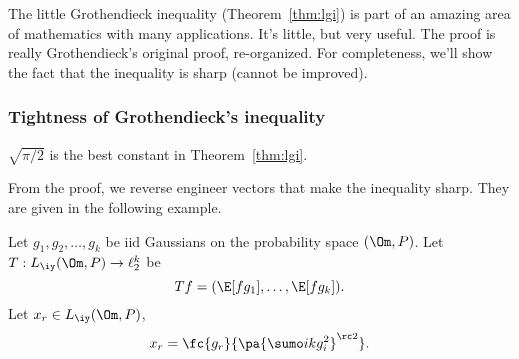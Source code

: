 

The little Grothendieck inequality (Theorem~\ref{thm:lgi}) is part of an amazing area of mathematics with many applications. It's little, but very useful. %
The proof is really Grothendieck's original proof, re-organized. For completeness, we'll show the fact that the inequality is sharp (cannot be improved). 

\subsubsection{Tightness of Grothendieck's inequality}

\begin{cor} $\sqrt{\pi/2}$ is the best constant in Theorem~\ref{thm:lgi}.
\end{cor}

From the proof, we reverse engineer vectors that make the inequality sharp. They are given in the following example. %

\begin{ex}
Let $g_1,g_2,\ldots,g_k $ be iid Gaussians on the probability space $(\Om, P)$. Let $T:L_{\iy}(\Om, P)\to \ell_2^k$ be %
\[
Tf = (\E[fg_1],\ldots, \E[fg_k]).
\]
Let $x_r \in L_{\iy} (\Om, P)$, 
\[
x_r = \fc{g_r}{\pa{\sumo ik g_i^2}^{\rc 2}}.
\]
\end{ex}

